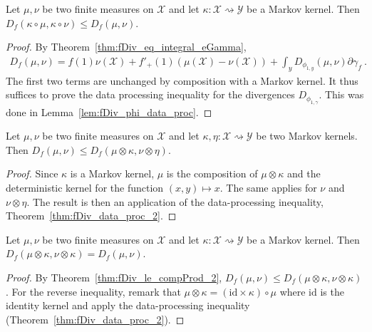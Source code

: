 \begin{theorem}
  \label{thm:fDiv_data_proc_2}
  Let $\mu, \nu$ be two finite measures on $\mathcal X$ and let $\kappa : \mathcal X \rightsquigarrow \mathcal Y$ be a Markov kernel.
  Then $D_f(\kappa \circ \mu, \kappa \circ \nu) \le D_f(\mu, \nu)$.
\end{theorem}

\begin{proof}%
{}
By Theorem~\ref{thm:fDiv_eq_integral_eGamma},
\begin{align*}
D_f(\mu, \nu) = f(1) \nu(\mathcal X) + f'_+(1) (\mu(\mathcal X) - \nu (\mathcal X)) + \int_y D_{\phi_{1,y}}(\mu, \nu) \partial\gamma_f \: .
\end{align*}
The first two terms are unchanged by composition with a Markov kernel. It thus suffices to prove the data processing inequality for the divergences $D_{\phi_{1, \gamma}}$. This was done in Lemma~\ref{lem:fDiv_phi_data_proc}.
\end{proof}


\begin{theorem}
  \label{thm:fDiv_le_compProd_2}
  Let $\mu, \nu$ be two finite measures on $\mathcal X$ and let $\kappa, \eta : \mathcal X \rightsquigarrow \mathcal Y$ be two Markov kernels.
  Then $D_f(\mu, \nu) \le D_f(\mu \otimes \kappa, \nu \otimes \eta)$.
\end{theorem}

\begin{proof}%
{}
Since $\kappa$ is a Markov kernel, $\mu$ is the composition of $\mu \otimes \kappa$ and the deterministic kernel for the function $(x,y) \mapsto x$. The same applies for $\nu$ and $\nu \otimes \eta$.
The result is then an application of the data-processing inequality, Theorem~\ref{thm:fDiv_data_proc_2}.
\end{proof}


\begin{lemma}
  \label{thm:fDiv_compProd_right_2}
  Let $\mu, \nu$ be two finite measures on $\mathcal X$ and let $\kappa : \mathcal X \rightsquigarrow \mathcal Y$ be a Markov kernel.
  Then $D_f(\mu \otimes \kappa, \nu \otimes \kappa) = D_f(\mu, \nu)$.
\end{lemma}

\begin{proof}%
{}
By Theorem~\ref{thm:fDiv_le_compProd_2}, $D_f(\mu, \nu) \le D_f(\mu \otimes \kappa, \nu \otimes \kappa)$.
For the reverse inequality, remark that $\mu \otimes \kappa = (\text{id} \times \kappa) \circ \mu$ where $\text{id}$ is the identity kernel and apply the data-processing inequality (Theorem~\ref{thm:fDiv_data_proc_2}). 
\end{proof}

